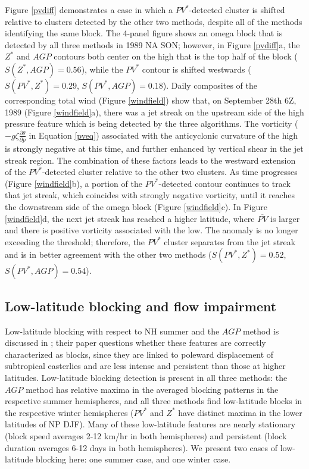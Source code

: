 \documentclass[smallextended]{svjour3}       %
\numberwithin{equation}{section}
\begin{document}
Figure \ref{pvdiff} demonstrates a case in which a $PV^*$-detected cluster is shifted relative to clusters detected by the other two methods, despite all of the methods identifying the same block. The 4-panel figure shows an omega block that is detected by all three methods in 1989 NA SON; however, in Figure \ref{pvdiff}a, the $Z^*$ and $AGP$ contours both center on the high that is the top half of the block ($S(Z^*, AGP)=0.56$), while the $PV^*$ contour is shifted westwards ($S(PV^*, Z^*)=0.29$, $S(PV^*, AGP)=0.18$). Daily composites of the corresponding total wind (Figure \ref{windfield}) show that, on September 28th 6Z, 1989 (Figure \ref{windfield}a), there was a jet streak on the upstream side of the high pressure feature which is being detected by the three algorithms. The vorticity ($-g\zeta \frac{\partial \theta}{\partial p}$ in Equation \ref{pveq}) associated with the anticyclonic curvature of the high is strongly negative at this time, and further enhanced by vertical shear in the jet streak region. The combination of these factors leads to the westward extension of the $PV^*$-detected cluster relative to the other two clusters. As time progresses (Figure \ref{windfield}b), a portion of the  $PV^*$-detected contour continues to track that jet streak, which coincides with strongly negative vorticity, until it reaches the downstream side of the omega block (Figure \ref{windfield}c). In Figure \ref{windfield}d, the next jet streak has reached a higher latitude, where $\overline{PV}$ is larger and there is positive vorticity associated with the low. The anomaly is no longer exceeding the threshold; therefore, the $PV^*$ cluster separates from the jet streak and is in better agreement with the other two methods ($S(PV^*, Z^*)=0.52$, $S(PV^*, AGP)=0.54$). 

\subsection{Low-latitude blocking and flow impairment}\label{lowlatsec}

Low-latitude blocking with respect to NH summer and the $AGP$ method is discussed in \cite{davini_bidimensional_2012};
{\color{blue}%
their paper questions} whether these features are correctly characterized as blocks, since they are linked to poleward displacement of subtropical easterlies and are less intense and persistent than those at higher latitudes. Low-latitude blocking detection is present in all three methods: the $AGP$ method has relative maxima in the averaged blocking patterns in the respective summer hemispheres, and all three methods find low-latitude blocks in the respective winter hemispheres ($PV^*$ and $Z^*$ have distinct maxima in the lower latitudes of NP DJF). Many of these low-latitude features are nearly stationary (block speed averages 2-12 km/hr in both hemispheres) and persistent (block duration averages 6-12 days in both hemispheres). We present two cases of low-latitude blocking here: one summer case, and one winter case.
\end{document}
